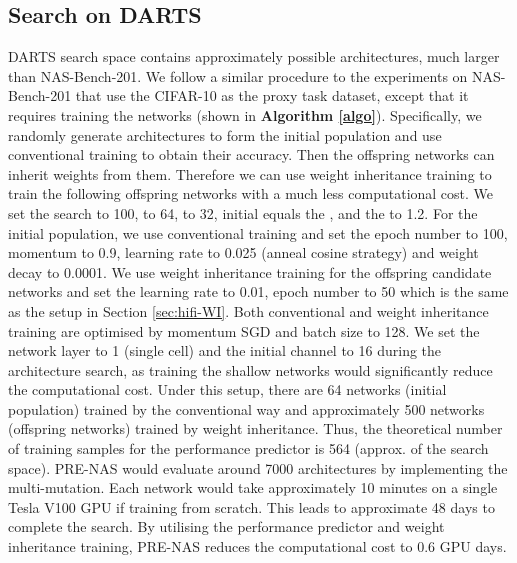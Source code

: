 \documentclass[sigconf]{acmart}
\begin{document}
\subsection{Search on DARTS}
DARTS search space contains approximately  possible architectures, much larger than NAS-Bench-201.  We follow a similar procedure to the experiments on NAS-Bench-201 that use the CIFAR-10 as the proxy task dataset, except that it requires training the networks (shown in \textbf{Algorithm \ref{algo}}).  Specifically, we randomly generate architectures to form the initial population and use conventional training to obtain their accuracy.  Then the offspring networks can inherit weights from them. Therefore we can use weight inheritance training to train the following offspring networks with a much less computational cost. We set the search  to 100,  to 64,  to 32, initial  equals the , and the  to 1.2. For the initial population, we use conventional training and set the epoch number to 100, momentum to 0.9, learning rate to 0.025 (anneal cosine strategy) and weight decay to 0.0001. We use weight inheritance training for the offspring candidate networks and set the learning rate to 0.01, epoch number to 50 which is the same as the setup in Section \ref{sec:hifi-WI}. Both conventional and weight inheritance training are optimised by momentum SGD and batch size to 128.  We set the network layer to 1 (single cell) and the initial channel to 16 during the architecture search, as training the shallow networks would significantly reduce the computational cost.  Under this setup, there are 64 networks (initial population) trained by the conventional way and approximately 500 networks (offspring networks) trained by weight inheritance. Thus, the theoretical number of training samples for the performance predictor is 564 (approx.  of the search space).  PRE-NAS would evaluate around 7000 architectures by implementing the multi-mutation.  Each network would take approximately 10 minutes on a single Tesla V100 GPU if training from scratch. This leads to approximate 48 days to complete the search. By utilising the performance predictor and weight inheritance training, PRE-NAS reduces the computational cost to 0.6 GPU days.
\end{document}
